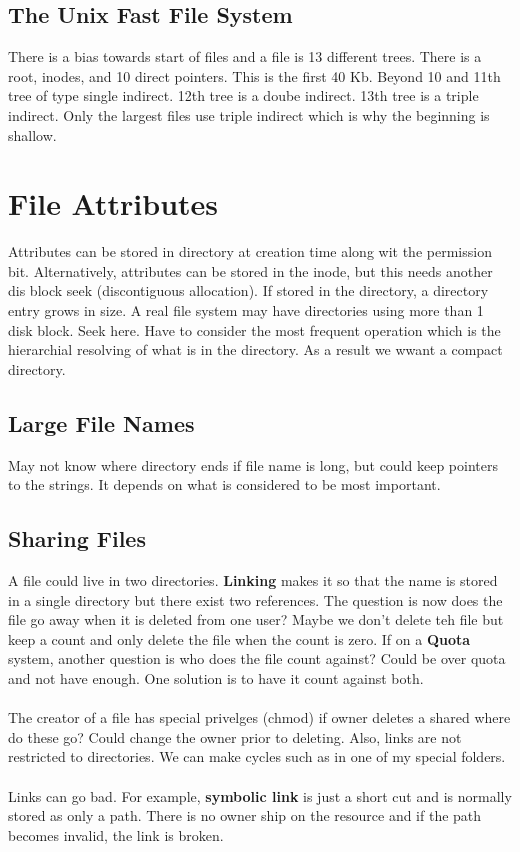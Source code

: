 \documentclass[../base_file/cs1550_notes.tex]{subfiles}
\begin{document}
\subsection{The Unix Fast File System}
There is a bias towards start of files and a file is 13 different trees.  There
is a root, inodes, and 10 direct pointers.  This is the first 40 Kb.  Beyond
10 and 11th tree of type single indirect.  12th tree is a doube indirect.  13th
tree is a triple indirect.  Only the largest files use triple indirect which
is why the beginning is shallow.
\section{File Attributes}
Attributes can be stored in directory at
creation time along wit the permission bit.  Alternatively, attributes can be
stored in the inode, but this needs another dis block seek (discontiguous allocation).
If stored in the directory, a directory entry grows in size.  A real file system
may have directories using more than 1 disk block.  Seek here.  Have to consider
the most frequent operation which is the hierarchial resolving of what is in the
directory. As a result we wwant a compact directory.
\subsection{Large File Names}
May not know where directory ends if file name is long, but could keep pointers
to the strings.  It depends on what is considered to be most important.
\subsection{Sharing Files}
A file could live in two directories.  \textbf{Linking} makes it so that the 
name is stored in a single directory but there exist two references.  The
question is now does the file go away when it is deleted from one user? Maybe
we don't delete teh file but keep a count and only delete the file when the
count is zero.  If on a \textbf{Quota} system, another question is who
does the file count against?  Could be over quota and not have enough. One
solution is to have it count against both.\\\\
The creator of a file has special privelges (chmod) if owner deletes a shared
where do these go?  Could change the owner prior to deleting.  Also, links are not
restricted to directories.  We can make cycles such as in one of my special folders.\\\\
Links can go bad.  For example, \textbf{symbolic link} is just a short cut and 
is normally stored as only a path.  There is no owner ship on the resource and if 
the path becomes invalid, the link is broken.
\end{document}
